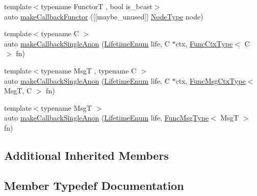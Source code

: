 \begin{DoxyCompactItemize}
\item 
{\footnotesize template$<$typename FunctorT , bool is\+\_\+bcast$>$ }\\auto \hyperlink{structvt_1_1pipe_1_1_pipe_manager_t_l_a84eb25c5c559d28563125d62a1705cf5}{make\+Callback\+Functor} (\mbox{[}\mbox{[}maybe\+\_\+unused\mbox{]}\mbox{]} \hyperlink{namespacevt_a866da9d0efc19c0a1ce79e9e492f47e2}{Node\+Type} node)
\item 
{\footnotesize template$<$typename C $>$ }\\auto \hyperlink{structvt_1_1pipe_1_1_pipe_manager_t_l_a974ab3bbfc8a972f5d016ebf70c5a6d7}{make\+Callback\+Single\+Anon} (\hyperlink{namespacevt_1_1pipe_acb42b284378c0fdac1d7c6335dc26f58}{Lifetime\+Enum} life, C $\ast$ctx, \hyperlink{structvt_1_1pipe_1_1_pipe_manager_base_ad8463823b6b4cfdb67c119d6d22e3bac}{Func\+Ctx\+Type}$<$ C $>$ fn)
\item 
{\footnotesize template$<$typename MsgT , typename C $>$ }\\auto \hyperlink{structvt_1_1pipe_1_1_pipe_manager_t_l_ad0dca13f93e697e5c6329919ae77378f}{make\+Callback\+Single\+Anon} (\hyperlink{namespacevt_1_1pipe_acb42b284378c0fdac1d7c6335dc26f58}{Lifetime\+Enum} life, C $\ast$ctx, \hyperlink{structvt_1_1pipe_1_1_pipe_manager_base_a73fdf82ece0411b3dc644c99b763f7a9}{Func\+Msg\+Ctx\+Type}$<$ MsgT, C $>$ fn)
\item 
{\footnotesize template$<$typename MsgT $>$ }\\auto \hyperlink{structvt_1_1pipe_1_1_pipe_manager_t_l_aea9bdf9ea02e21ebd98393907ff432ea}{make\+Callback\+Single\+Anon} (\hyperlink{namespacevt_1_1pipe_acb42b284378c0fdac1d7c6335dc26f58}{Lifetime\+Enum} life, \hyperlink{structvt_1_1pipe_1_1_pipe_manager_base_aa54eee64ab32a27777a672d49eb861f4}{Func\+Msg\+Type}$<$ MsgT $>$ fn)
\end{DoxyCompactItemize}
\subsection*{Additional Inherited Members}


\subsection{Member Typedef Documentation}
\mbox{\label{structvt_1_1pipe_1_1_pipe_manager_t_l_af6fc2c17f1729fa06450441b0ee81cb1}} 
